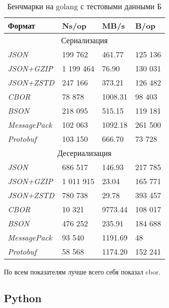 \begin{table}[ht!]
\centering
\caption{Бенчмарки на golang с тестовыми данными Б}
\begin{tabular}{|l|l|l|l|} 
\hline
\textbf{Формат}      & \textbf{Ns/op} & \textbf{MB/s} & \textbf{B/op}  \\ 
\hline
\multicolumn{4}{|c|}{Сериализация}                                        \\ 
\hline
\textit{JSON}        & 199 762         & 461.77        & 125 136         \\ 
\hline
\textit{JSON+GZIP}   & 1 199 464        & 76.90         & 130 031         \\ 
\hline
\textit{JSON+ZSTD}   & 247 166         & 373.21        & 126 482         \\ 
\hline
\textit{CBOR}        & 78 878          & 1008.31       & 98 403          \\ 
\hline
\textit{BSON}        & 218 095         & 515.15        & 119 181         \\ 
\hline
\textit{MessagePack} & 102 063         & 1092.18       & 261 500         \\ 
\hline
\textit{Protobuf}    & 103 150         & 666.70        & 73 728          \\ 
\hline
\multicolumn{4}{|c|}{Десериализация}                                      \\ 
\hline
\textit{JSON}        & 686 517         & 146.93        & 217 785         \\ 
\hline
\textit{JSON+GZIP}   & 1 011 915        & 23.04         & 165 771         \\ 
\hline
\textit{JSON+ZSTD}   & 780 738         & 29.78         & 393 457         \\ 
\hline
\textit{CBOR}        & 10 321          & 9773.44       & 108 017         \\ 
\hline
\textit{BSON}        & 476 252         & 235.91        & 184 688         \\ 
\hline
\textit{MessagePack} & 93 540          & 1191.69       & 48             \\ 
\hline
\textit{Protobuf}    & 58 568          & 1174.20       & 152 241         \\
\hline
\end{tabular}
\end{table}

По всем показателям лучше всего себя показал cbor.  


\clearpage

\subsection{Python}

